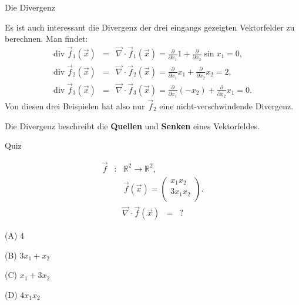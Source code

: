 \documentclass[german]{beamer}
\newcommand{\bq}{\begin{eqnarray*}}
\newcommand{\eq}{\end{eqnarray*}}
\begin{document}
\begin{frame}{Die Divergenz}

\begin{example}
Es ist auch interessant die Divergenz der drei eingangs gezeigten Vektorfelder zu berechnen.
Man findet:
\bq
 \mbox{div} \; \vec{f}_1(\vec{x})
 & = &
 \vec{\nabla} \cdot \vec{f}_1(\vec{x})
 = 
 \frac{\partial}{\partial x_1} 1 + \frac{\partial}{\partial x_2} \sin x_1 = 0,
 \nonumber \\
 \mbox{div} \; \vec{f}_2(\vec{x})
 & = &
 \vec{\nabla} \cdot \vec{f}_2(\vec{x})
 = 
 \frac{\partial}{\partial x_1} x_1 + \frac{\partial}{\partial x_2} x_2 = 2,
 \nonumber \\
 \mbox{div} \; \vec{f}_3(\vec{x})
 & = &
 \vec{\nabla} \cdot \vec{f}_3(\vec{x})
 = 
 \frac{\partial}{\partial x_1} \left( - x_2 \right) + \frac{\partial}{\partial x_2} x_1 = 0.
\eq
Von diesen drei Beispielen hat also nur $\vec{f}_2$ eine nicht-verschwindende Divergenz.

Die Divergenz beschreibt die {\bf Quellen} und {\bf Senken} eines Vektorfeldes.
\end{example}

\end{frame}

\begin{frame}{Quiz}

\bq
 \vec{f} & : & {\mathbb R}^2 \rightarrow {\mathbb R}^2,
 \nonumber \\
 & & \vec{f}\left(\vec{x}\right)
 =
 \left( \begin{array}{c}
  x_1 x_2 \\ 3 x_1 x_2 \\
 \end{array} \right).
\eq
\bq
 \vec{\nabla} \cdot \vec{f}\left(\vec{x}\right)
 & = & ?
\eq
\begin{description}
\item{(A)} $4$
\item{(B)} $3 x_1 + x_2$
\item{(C)} $x_1 + 3 x_2$
\item{(D)} $4 x_1 x_2$
\end{description}

\end{frame}
\end{document}
